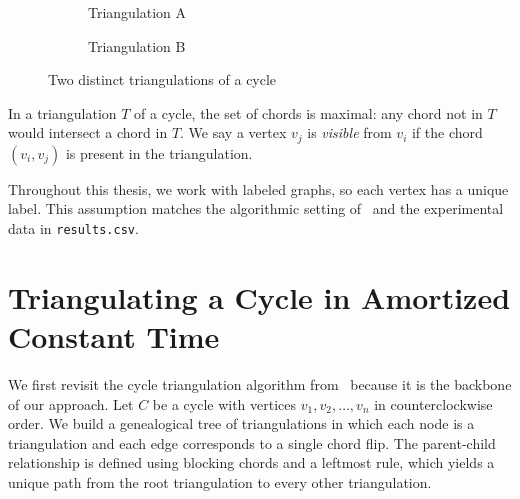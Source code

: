 \documentclass[12pt,a4paper]{report}
\theoremstyle{definition}
\theoremstyle{remark}
\begin{document}
\begin{figure}[h]
    \centering
    \begin{subfigure}{0.45\textwidth}
        \centering
        \caption{Triangulation A}
    \end{subfigure}
    \hfill
    \begin{subfigure}{0.45\textwidth}
        \centering
        \caption{Triangulation B}
    \end{subfigure}
    \caption{Two distinct triangulations of a cycle}
    \label{fig:distinct_triangulations}
\end{figure}

In a triangulation $T$ of a cycle, the set of chords is maximal: any chord not in $T$
would intersect a chord in $T$. We say a vertex $v_j$ is \textit{visible} from $v_i$ if
the chord $(v_i,v_j)$ is present in the triangulation.

Throughout this thesis, we work with labeled graphs, so each vertex has a unique label.
This assumption matches the algorithmic setting of~\cite{parvez2011} and the experimental
data in \texttt{results.csv}.

\chapter{Triangulating a Cycle in Amortized Constant Time}
\label{chap:cycle}

We first revisit the cycle triangulation algorithm from~\cite{parvez2011} because it is
the backbone of our approach. Let $C$ be a cycle with vertices $v_1,v_2,\ldots,v_n$ in
counterclockwise order. We build a genealogical tree of triangulations in which each node
is a triangulation and each edge corresponds to a single chord flip. The parent-child
relationship is defined using blocking chords and a leftmost rule, which yields a unique
path from the root triangulation to every other triangulation.
\end{document}
